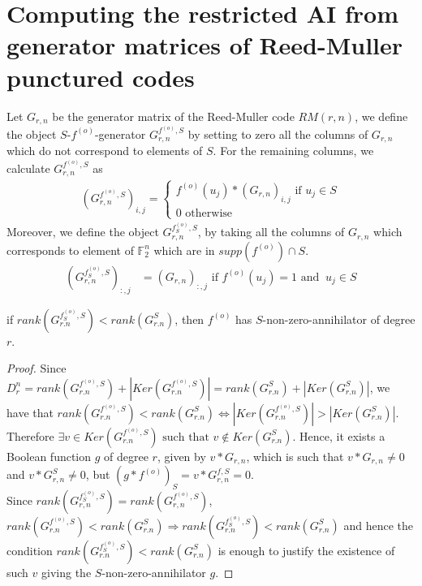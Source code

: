 \documentclass[11pt]{llncs}
\begin{document}
\section{Computing the restricted AI from generator matrices of Reed-Muller punctured codes}\label{sec:RMapproach}
\begin{definition}
	Let $G_{r,n}$ be the generator matrix of the Reed-Muller code $RM(r,n)$, we define the object $S$-$f^{(o)}$-generator $G_{r,n}^{f^{(o)},S}$ by setting to zero all the columns of $G_{r,n}$ which do not correspond to elements of $S$. For the remaining columns, we calculate $G_{r,n}^{f^{(o)},S}$ as
	\begin{align*}
	\left(G_{r,n}^{f^{(o)},S}\right)_{i,j} =
	\begin{cases}
	f^{(o)}(u_j)*\left(G_{r,n}\right)_{i,j} \mbox{ if }u_j \in S\\
	0 \mbox{ otherwise}
	\end{cases}
	\end{align*}
	Moreover, we define the object $G_{r,n}^{f^{(o)}_S,S}$, by taking all the columns of $G_{r,n}$ which corresponds to element of $\mathbb{F}_2^n$ which are in $supp\left(f^{(o)}\right) \cap S$.
	\begin{align}
	\left(G_{r,n}^{f_S^{(o)},S}\right)_{:,j}           & = (G_{r,n})_{:,j} \mbox{ if } f^{(o)}(u_j) = 1 \mbox{ and } \ u_j\in S \label{eq:f-generatorRestrictedSet}
	\end{align}
\end{definition}

\begin{proposition}\label{prop:compareranks}
	if $rank(G^{f_S^{(o)},S}_{r.n}) < rank(G^{S}_{r.n})$, then $f^{(o)}$ has $S$-non-zero-annihilator of degree $r$.
\end{proposition}
\begin{proof}
	Since $D_r^n = rank(G^{f^{(o)},S}_{r.n}) + |Ker(G^{f^{(o)},S}_{r.n})| =  rank(G^{S}_{r.n}) + |Ker(G^{S}_{r.n})|$, we have that
	$rank(G^{f^{(o)},S}_{r.n}) < rank(G^{S}_{r.n}) \iff |Ker(G^{f^{(o)},S}_{r.n})| > |Ker(G^{S}_{r.n})|$. Therefore $\exists v\in Ker(G^{f^{(o)},S}_{r.n}) \mbox{ such that }v\not\in Ker(G^{S}_{r.n})$. Hence, it exists a Boolean function $g$ of degree $r$, given by $v*G_{r,n}$, which is such that $v*G_{r,n}\neq 0$ and $v*G_{r,n}^{S}\neq 0$, but $(g*f^{(o)})_S = v*G_{r,n}^{f,S} = 0$.\\
	Since $rank\left(G_{r,n}^{f_S^{(o)}, S}\right) = rank\left(G_{r,n}^{f^{(o)}, S}\right)$, $rank(G^{f^{(o)},S}_{r.n}) < rank(G^{S}_{r.n}) \Rightarrow rank(G^{f_S^{(o)},S}_{r.n}) < rank(G^{S}_{r.n})$ and hence the condition $rank(G^{f_S^{(o)},S}_{r.n}) < rank(G^{S}_{r.n})$ is enough to justify the existence of such $v$ giving the $S$-non-zero-annihilator $g$.
\end{proof}
\end{document}
